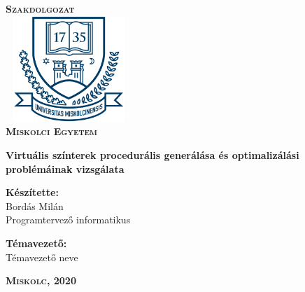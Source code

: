 \begin{titlepage}
\centering
\vspace*{2cm}
\huge\textsc{\textbf{Szakdolgozat}}\\[1cm]
\includegraphics[width=4.8cm, height=4cm,keepaspectratio]{images/me_logo.png}\\
\textbf{\textsc{Miskolci Egyetem}}

\vspace*{2cm}

{\LARGE\textbf{Virtuális színterek procedurális generálása és optimalizálási problémáinak vizsgálata}}

\vspace*{2cm}
\large
\textbf{Készítette:}\\[0.8ex]
Bordás Milán\\[0.8ex]
Programtervező informatikus

\vspace*{0.5cm}
\textbf{Témavezető:}\\[0.8ex]
Témavezető neve

\vfill

\large
\textbf{\textsc{Miskolc, 2020}}

\end{titlepage}